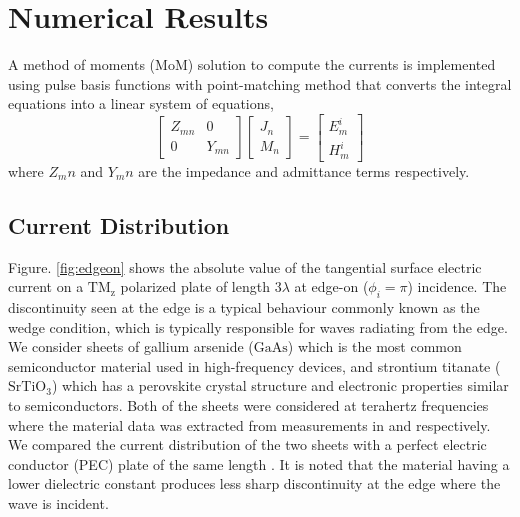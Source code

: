 \documentclass{ieeeaccess}
\renewcommand{\^}{\hat}  %
\begin{document}
\section{Numerical Results}
%
A method of moments (MoM) solution to compute the currents is implemented using pulse basis functions with point-matching method \cite{Harrington1993} that converts the integral equations into a linear system of equations,
%
\begin{equation}
\begin{bmatrix}
  Z_{mn}   & 0 \\
  0        & Y_{mn}
\end{bmatrix}
\begin{bmatrix}
  J_n \\
  M_n
\end{bmatrix}
=
\begin{bmatrix}
  E_m^i \\
  H_m^i
\end{bmatrix}
\label{eq:MOM}
\end{equation}
%
where $Z_mn$ and $Y_mn$ are the impedance and admittance terms respectively.

\subsection{Current Distribution}
%
Figure. \ref{fig:edgeon} shows the absolute value of the tangential surface electric current on a $\mathrm{TM_z}$ polarized plate of length $3 \lambda$ at edge-on ($\phi_i = \pi$) incidence. The discontinuity seen at the edge is a typical behaviour commonly known as the wedge condition, which is typically responsible for waves radiating from the edge. We consider sheets of gallium arsenide ($\mathrm{GaAs}$) which is the most common semiconductor material used in high-frequency devices, and strontium titanate ($\mathrm{SrTiO_3}$) which has a perovskite crystal structure and electronic properties similar to semiconductors. Both of the sheets were considered at terahertz frequencies where the material data was extracted from measurements in \cite{Burke2000} and \cite{herranz2012high} respectively. We compared the current distribution of the two sheets with a perfect electric conductor (PEC) plate of the same length \cite{senior1979backscattering}. It is noted that the material having a lower dielectric constant produces less sharp discontinuity at the edge where the wave is incident.
%
%
\end{document}
